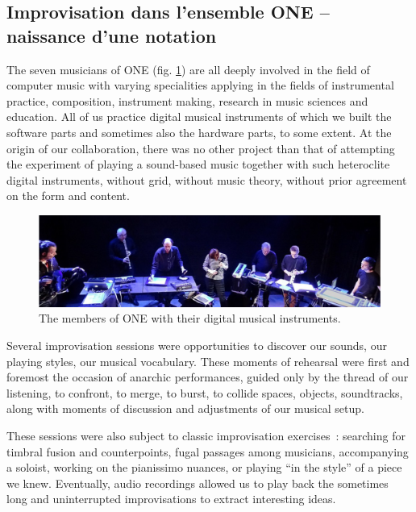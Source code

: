 \subsection{Improvisation dans l'ensemble ONE – naissance d'une notation}

The seven musicians of ONE (fig. \ref{fig:notation:one-fullband}) are all deeply involved in the field of computer music with varying specialities applying in the fields of instrumental practice, composition, instrument making, research in music sciences and education. All of us practice digital musical instruments of which we built the software parts and sometimes also the hardware parts, to some extent. At the origin of our collaboration, there was no other project than that of attempting the experiment of playing a sound-based music together with such heteroclite digital instruments, without grid, without music theory, without prior agreement on the form and content.

\begin{figure}[htb]
	\includegraphics[width=\textwidth]{gfx/notation/ONE-fullBand.png}
	\caption{The members of ONE with their digital musical instruments.}
	\label{fig:notation:one-fullband}
\end{figure}

Several improvisation sessions were opportunities to discover our sounds, our playing styles, our musical vocabulary. These moments of rehearsal were first and foremost the occasion of anarchic performances, guided only by the thread of our listening, to confront, to merge, to burst, to collide spaces, objects, soundtracks, along with moments of discussion and adjustments of our musical setup.

These sessions were also subject to classic improvisation exercises : searching for timbral fusion and counterpoints, fugal passages among musicians, accompanying a soloist, working on the pianissimo nuances, or playing “in the style” of a piece we knew. Eventually, audio recordings allowed us to play back the sometimes long and uninterrupted improvisations to extract interesting ideas.

